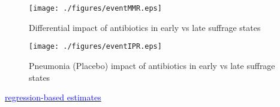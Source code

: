 \documentclass[9pt,letterpaper,subeqn]{beamer}
\begin{document}
\begin{frame}[label=MMREvent,plain]
\begin{figure}
\caption{Differential impact of antibiotics in early vs late suffrage states}
\texttt{[image: ./figures/eventMMR.eps]}
\end{figure}
\end{frame}


\begin{frame}[label=IPREvent,plain]
\begin{figure}
\caption{Pneumonia (Placebo) impact of antibiotics in early vs late suffrage states}
\texttt{[image: ./figures/eventIPR.eps]}
\end{figure}
\hyperlink{DDreg}{\textcolor{blue}{regression-based estimates}}
\end{frame}




\end{document}
